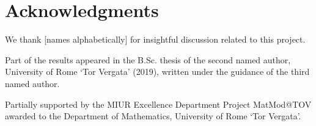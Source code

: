 
\section*{Acknowledgments}

We thank [names alphabetically] for insightful discussion related to this project.

Part of the results appeared in the B.Sc. thesis of the second named author, University of Rome `Tor Vergata' (2019), written under the guidance of the third named author.

Partially supported by the MIUR Excellence Department Project
MatMod@TOV awarded to the Department of Mathematics, University of Rome
`Tor Vergata'.
